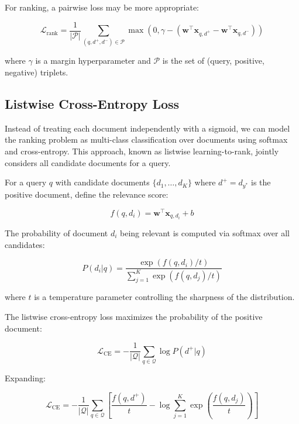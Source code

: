 \documentclass[11pt,a4paper]{article}
\begin{document}
For ranking, a pairwise loss may be more appropriate:

\begin{equation}
    \mathcal{L}_{\text{rank}} = \frac{1}{|\mathcal{P}|} \sum_{(q, d^+, d^-) \in \mathcal{P}} \max\left(0, \gamma - (\mathbf{w}^\top \mathbf{x}_{q,d^+} - \mathbf{w}^\top \mathbf{x}_{q,d^-})\right)
\end{equation}

where $\gamma$ is a margin hyperparameter and $\mathcal{P}$ is the set of (query, positive, negative) triplets.

\subsection{Listwise Cross-Entropy Loss}

Instead of treating each document independently with a sigmoid, we can model the ranking problem as multi-class classification over documents using softmax and cross-entropy. This approach, known as listwise learning-to-rank, jointly considers all candidate documents for a query.

For a query $q$ with candidate documents $\{d_1, \ldots, d_K\}$ where $d^+ = d_{y^*}$ is the positive document, define the relevance score:

\begin{equation}
    f(q, d_i) = \mathbf{w}^\top \mathbf{x}_{q,d_i} + b
\end{equation}

The probability of document $d_i$ being relevant is computed via softmax over all candidates:

\begin{equation}
    P(d_i | q) = \frac{\exp(f(q, d_i) / t)}{\sum_{j=1}^{K} \exp(f(q, d_j) / t)}
\end{equation}

where $t$ is a temperature parameter controlling the sharpness of the distribution.

The listwise cross-entropy loss maximizes the probability of the positive document:

\begin{equation}
    \mathcal{L}_{\text{CE}} = -\frac{1}{|\mathcal{Q}|} \sum_{q \in \mathcal{Q}} \log P(d^+ | q)
\end{equation}

Expanding:

\begin{equation}
    \mathcal{L}_{\text{CE}} = -\frac{1}{|\mathcal{Q}|} \sum_{q \in \mathcal{Q}} \left[ \frac{f(q, d^+)}{t} - \log \sum_{j=1}^{K} \exp\left(\frac{f(q, d_j)}{t}\right) \right]
\end{equation}
\end{document}
